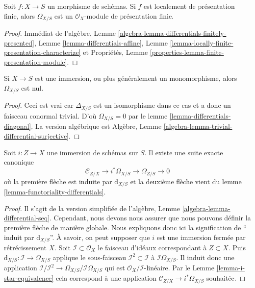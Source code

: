 \begin{lemma}
\label{lemma-finite-presentation-differentials}
Soit $f : X \to S$ un morphisme de schémas. Si
$f$ est localement de présentation finie, alors $\Omega_{X/S}$
est un $\mathcal{O}_X$-module de présentation finie.
\end{lemma}

\begin{proof}
Immédiat
de l'algèbre, Lemme \ref{algebra-lemma-differentials-finitely-presented},
Lemme \ref{lemma-differentials-affine},
Lemme \ref{lemma-locally-finite-presentation-characterize} et Propriétés,
Lemme \ref{properties-lemma-finite-presentation-module}.
\end{proof}

\begin{lemma}
\label{lemma-immersion-differentials}
Si $X \to S$ est une immersion, ou plus généralement un monomorphisme, alors
$\Omega_{X/S}$ est nul.
\end{lemma}

\begin{proof}
Ceci est vrai car $\Delta_{X/S}$ est un isomorphisme
dans ce cas et a donc un faisceau conormal trivial.
D'où $\Omega_{X/S} = 0$ par le lemme \ref{lemma-differentials-diagonal}. La version
algébrique est Algèbre, Lemme \ref{algebra-lemma-trivial-differential-surjective}.
\end{proof}

\begin{lemma}
\label{lemma-differentials-relative-immersion}
Soit $i : Z \to X$ une immersion de schémas sur $S$. Il
existe une suite exacte canonique
$$
\mathcal{C}_{Z/X} \to i^*\Omega_{X/S} \to \Omega_{Z/S} \to 0
$$
où la première flèche est induite par $\text{d}_{X/S}$
et la deuxième flèche vient du lemme \ref{lemma-functoriality-differentials}.
\end{lemma}

\begin{proof}
Il s'agit de la version simplifiée
de l'algèbre, Lemme \ref{algebra-lemma-differential-seq}. Cependant, nous
devons nous assurer que nous pouvons définir la
première flèche de manière globale. Nous expliquons donc ici
la signification de `` induit par $\text{d}_{X/S}$''.
À savoir, on peut supposer
que $i$ est une immersion fermée par rétrécissement
$X$. Soit $\mathcal{I} \subset \mathcal{O}_X$ le
faisceau d'idéaux correspondant à $Z \subset X$. Puis
$\text{d}_{X/S} : \mathcal{I} \to \Omega_{X/S}$ applique le sous-faisceau $\mathcal{I}^2 \subset \mathcal{I}$
à $\mathcal{I}\Omega_{X/S}$. Il induit donc une application $\mathcal{I}/\mathcal{I}^2 \to \Omega_{X/S}/\mathcal{I}\Omega_{X/S}$
qui est $\mathcal{O}_X/\mathcal{I}$-linéaire.
Par le Lemme \ref{lemma-i-star-equivalence} cela correspond à une application
$\mathcal{C}_{Z/X} \to i^*\Omega_{X/S}$ souhaitée.
\end{proof}

